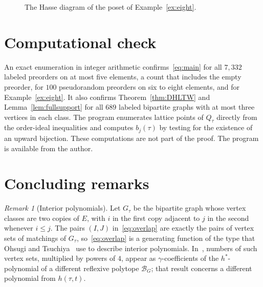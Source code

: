 \documentclass[11pt]{amsart}
\theoremstyle{definition}
\theoremstyle{remark}
\newtheorem{remark}[theorem]{Remark}
\numberwithin{equation}{section}
\begin{document}
\begin{figure}[ht]
\centering
{}
\caption{The Hasse diagram of the poset of Example~\ref{ex:eight}.}
\label{fig:eight}
\end{figure}

\section{Computational check}\label{sec:computation}

An exact enumeration in integer arithmetic confirms~\eqref{eq:main} for all $7{,}332$ labeled preorders on at most five elements, a count that includes the empty preorder, for $100$ pseudorandom preorders on six to eight elements, and for Example~\ref{ex:eight}. It also confirms Theorem~\ref{thm:DHLTW} and Lemma~\ref{lem:fullsupport} for all $689$ labeled bipartite graphs with at most three vertices in each class. The program enumerates lattice points of $Q_\tau$ directly from the order-ideal inequalities and computes $b_j(\tau)$ by testing for the existence of an upward bijection. These computations are not part of the proof. The program is available from the author.

\section{Concluding remarks}\label{sec:remarks}

\begin{remark}[Interior polynomials]\label{rem:OT}
Let $G_\tau$ be the bipartite graph whose vertex classes are two copies of $E$, with $i$ in the first copy adjacent to $j$ in the second whenever $i\le j$. The pairs $(I,J)$ in~\eqref{eq:overlap} are exactly the pairs of vertex sets of matchings of $G_\tau$, so~\eqref{eq:overlap} is a generating function of the type that Ohsugi and Tsuchiya~\cite[Proposition~3.4]{OT} use to describe interior polynomials. In~\cite[Theorem~0.3]{OT}, numbers of such vertex sets, multiplied by powers of $4$, appear as $\gamma$-coefficients of the $h^*$-polynomial of a different reflexive polytope $\mathcal{B}_G$; that result concerns a different polynomial from $h(\tau,t)$.
\end{remark}
\end{document}
